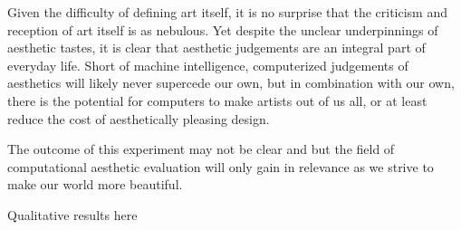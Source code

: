 \documentclass[midd]{thesis}
\begin{document}

Given the difficulty of defining art itself, it is no surprise that the criticism and reception of art itself is as nebulous. Yet despite the unclear underpinnings of aesthetic tastes, it is clear that aesthetic judgements are an integral part of everyday life. Short of machine intelligence, computerized judgements of aesthetics will likely never supercede our own, but in combination with our own, there is the potential for computers to make artists out of us all, or at least reduce the cost of aesthetically pleasing design.

The outcome of this experiment may not be clear and but the field of computational aesthetic evaluation will only gain in relevance as we strive to make our world more beautiful.


Qualitative results here

\nocite{*}

\end{document}
